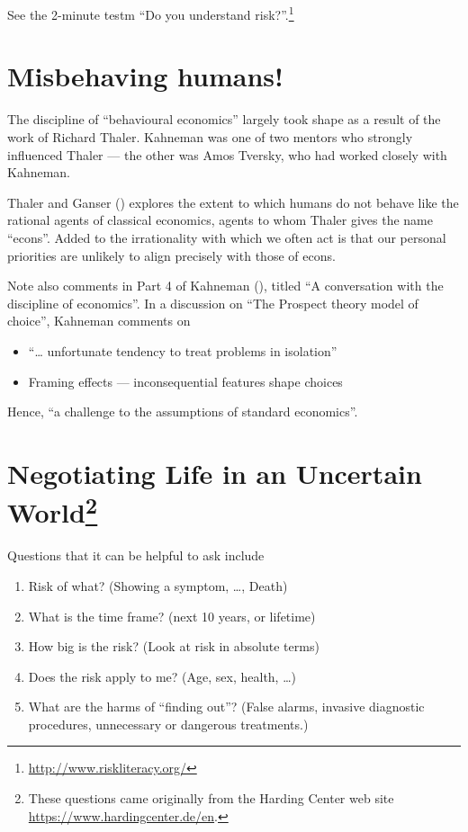 \documentclass[
  10ptls,
  b5paper]{book}
\providecommand{\tightlist}{%
  \setlength{\itemsep}{0pt}\setlength{\parskip}{0pt}}
\begin{document}
See the 2-minute testm ``Do you understand risk?''.\footnote{\url{http://www.riskliteracy.org/}}

\section{Misbehaving humans!}\label{misbehaving-humans}

The discipline of ``behavioural economics'' largely took shape as a result of the work of Richard Thaler. Kahneman was one of two mentors who strongly influenced Thaler --- the other was Amos Tversky, who had worked closely with Kahneman.

Thaler and Ganser () explores the extent to which humans do not behave like the rational agents of classical economics, agents to whom Thaler gives the name ``econs''. Added to the irrationality with which we often act is that our personal priorities are unlikely to align precisely with those of econs.

Note also comments in Part 4 of Kahneman (), titled ``A conversation with the discipline of economics''. In a discussion on ``The Prospect theory model of choice'', Kahneman comments on

\begin{itemize}
\tightlist
\item
  ``\ldots{} unfortunate tendency to treat problems in isolation''
\item
  Framing effects --- inconsequential features shape choices
\end{itemize}

Hence, ``a challenge to the assumptions of standard economics''.

\section[Negotiating Life in an Uncertain World]{\texorpdfstring{Negotiating Life in an Uncertain World\footnote{These questions came originally from the Harding Center web site \url{https://www.hardingcenter.de/en}.}}{Negotiating Life in an Uncertain World}}\label{negotiating-life-in-an-uncertain-world01-judgment-5}

Questions that it can be helpful to ask include

\begin{enumerate}
\def\labelenumi{\arabic{enumi}.}
\tightlist
\item
  Risk of what? (Showing a symptom, \ldots, Death)
\item
  What is the time frame? (next 10 years, or lifetime)
\item
  How big is the risk? (Look at risk in absolute terms)
\item
  Does the risk apply to me? (Age, sex, health, \ldots)
\item
  What are the harms of ``finding out''? (False alarms, invasive diagnostic procedures, unnecessary or dangerous treatments.)
\end{enumerate}
\end{document}
